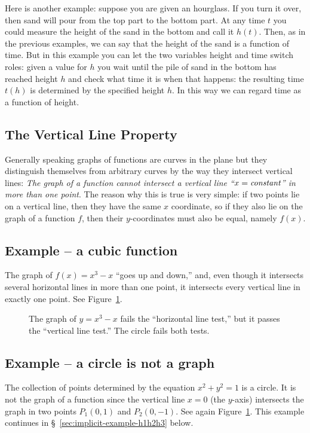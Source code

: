 %
Here is another example: suppose you are given an hourglass.  If you turn
it over, then sand will pour from the top part to the bottom part.  At any
time $t$ you could measure the height of the sand in the bottom and
call it $h(t)$.  Then, as in the previous examples, we can say that the height of
the sand is a function of time.  But in this example you can let the two
variables height and time switch roles: given a value for $h$ you wait
until the pile of sand in the bottom has reached height $h$ and check what
time it is when that happens: the resulting time $t(h)$ is determined by
the specified height $h$.  In this way we can regard time as a function of
height.

\subsection{The Vertical Line Property}
Generally speaking graphs of functions are curves in the plane but
they distinguish themselves from arbitrary curves by the way they
intersect vertical lines: \emph{The graph of a function cannot
intersect a vertical line ``$x=\text{\em constant}$'' in more than one
point}.  The reason why this is true is very simple: if two points lie
on a vertical line, then they have the same $x$ coordinate, so if they
also lie on the graph of a function $f$, then their $y$-coordinates
must also be equal, namely $f(x)$.


\subsection{Example -- a cubic function}
The graph of $f(x) = x^3-x$ ``goes up and down,'' and, even though it
intersects several horizontal lines in more than one point, it
intersects every vertical line in exactly one point.  See
Figure~\ref{fig:01horizontal-and-vertical-line-tests}.

\begin{figure}[t]\centering
  \caption{The graph of $y=x^3-x$ fails the ``horizontal line test,'' but it
    passes the ``vertical line test.''  The circle fails both tests.}
  \label{fig:01horizontal-and-vertical-line-tests}
\end{figure}

\subsection{Example -- a circle is not a graph}
\label{sec:01circle-izno-graph}
The collection of points determined by the equation $x^2+y^2=1$ is a circle.  It
is not the graph of a function since the vertical line $x=0$ (the $y$-axis)
intersects the graph in two points $P_1(0,1)$ and $P_2(0,-1)$. See again
Figure~\ref{fig:01horizontal-and-vertical-line-tests}.  This example
continues in \S~\ref{sec:implicit-example-h1h2h3} below.


